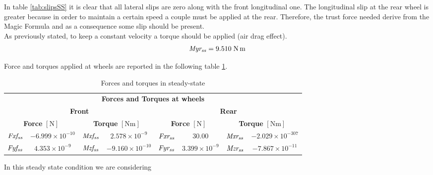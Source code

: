 In table \ref{tab:slipsSS} it is clear that all lateral slips are zero along with the front longitudinal one. The longitudinal slip at the rear wheel is greater because in order to maintain a certain speed a couple must be applied at the rear. Therefore, the trust force needed derive from the Magic Formula and as a consequence some slip should be present.\\
As previously stated, to keep a constant velocity a torque should be applied (air drag effect).
%
\begin{equation}
    { \it Myr_{ss}  }   = 9.510 \; \si{\newton\metre}                
\end{equation}
%

Force and torques applied at wheels are reported in the following table \ref{tab:FandTSS}.

\begin{table}[h!]
    \centering
    \begin{tabular}{@{}cccccccc@{}}
    \toprule
    \multicolumn{8}{c}{\textbf{Forces and Torques at wheels}}                         \\
    \multicolumn{4}{c}{\textbf{Front}} & \multicolumn{4}{c}{\textbf{Rear}} \\ 
    \multicolumn{2}{c}{\textbf{Force} $[\si{\newton}]$} & \multicolumn{2}{c}{\textbf{Torque} $[\si{\newton\metre}]$} & \multicolumn{2}{c}{\textbf{Force} $[\si{\newton}]$} & \multicolumn{2}{c}{\textbf{Torque} $[\si{\newton\metre}]$} \\ \midrule
    ${\it Fxf_{ss}}$ & $-6.999\times10^{-10}$ & ${ \it Mxf_{ss}}$ & $2.578\times10^{-9}  $ & ${\it Fxr_{ss}}$ & $30.00             $ & ${\it Mxr_{ss}}$ & $-2.029\times10^{-307}$\\
    ${\it Fyf_{ss}}$ & $4.353\times10^{-9}  $ & ${ \it Mzf_{ss}}$ & $-9.160\times10^{-10}$ & ${\it Fyr_{ss}}$ & $3.399\times10^{-9}$ & ${\it Mzr_{ss}}$ & $-7.867\times10^{-11} $\\ 
    \bottomrule
    \end{tabular}
    \caption{Forces and torques in steady-state}
    \label{tab:FandTSS}
\end{table}

In this steady state condition we are considering


 
 







